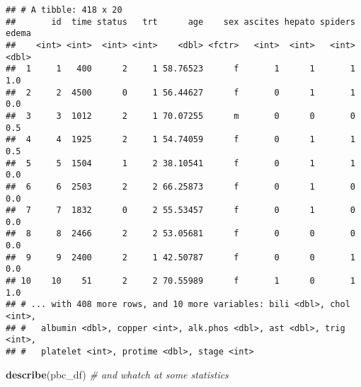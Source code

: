 \documentclass[]{book}
\newenvironment{Shaded}{\begin{snugshade}}{\end{snugshade}}
\newcommand{\KeywordTok}[1]{\textcolor[rgb]{0.13,0.29,0.53}{\textbf{{#1}}}}
\newcommand{\CommentTok}[1]{\textcolor[rgb]{0.56,0.35,0.01}{\textit{{#1}}}}
\newcommand{\NormalTok}[1]{{#1}}
\theoremstyle{definition}
\theoremstyle{definition}
\theoremstyle{definition}
\theoremstyle{remark}
\begin{document}
\begin{verbatim}
## # A tibble: 418 x 20
##       id  time status   trt      age    sex ascites hepato spiders edema
##    <int> <int>  <int> <int>    <dbl> <fctr>   <int>  <int>   <int> <dbl>
##  1     1   400      2     1 58.76523      f       1      1       1   1.0
##  2     2  4500      0     1 56.44627      f       0      1       1   0.0
##  3     3  1012      2     1 70.07255      m       0      0       0   0.5
##  4     4  1925      2     1 54.74059      f       0      1       1   0.5
##  5     5  1504      1     2 38.10541      f       0      1       1   0.0
##  6     6  2503      2     2 66.25873      f       0      1       0   0.0
##  7     7  1832      0     2 55.53457      f       0      1       0   0.0
##  8     8  2466      2     2 53.05681      f       0      0       0   0.0
##  9     9  2400      2     1 42.50787      f       0      0       1   0.0
## 10    10    51      2     2 70.55989      f       1      0       1   1.0
## # ... with 408 more rows, and 10 more variables: bili <dbl>, chol <int>,
## #   albumin <dbl>, copper <int>, alk.phos <dbl>, ast <dbl>, trig <int>,
## #   platelet <int>, protime <dbl>, stage <int>
\end{verbatim}

\begin{Shaded}
\begin{Highlighting}[]
\KeywordTok{describe}\NormalTok{(pbc_df)                                 }\CommentTok{# and whatch at some statistics}
\end{Highlighting}
\end{Shaded}
\end{document}
